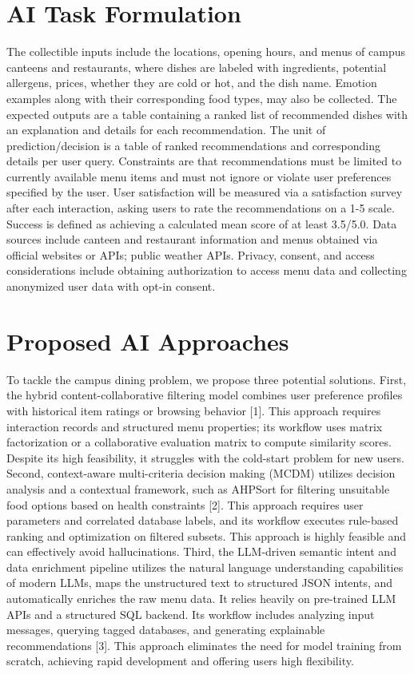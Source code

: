 \documentclass{article}
\begin{document}
\section{AI Task Formulation}
The collectible inputs include the locations, opening hours, and menus of campus canteens and restaurants, where dishes are labeled with ingredients, potential allergens, prices, whether they are cold or hot, and the dish name. Emotion examples along with their corresponding food types, may also be collected. The expected outputs are a table containing a ranked list of recommended dishes with an explanation and details for each recommendation. The unit of prediction/decision is a table of ranked recommendations and corresponding details per user query. Constraints are that recommendations must be limited to currently available menu items and must not ignore or violate user preferences specified by the user. User satisfaction will be measured via a satisfaction survey after each interaction, asking users to rate the recommendations on a 1-5 scale. Success is defined as achieving a calculated mean score of at least 3.5/5.0. Data sources include canteen and restaurant information and menus obtained via official websites or APIs; public weather APIs. Privacy, consent, and access considerations include obtaining authorization to access menu data and collecting anonymized user data with opt-in consent.

\section{Proposed AI Approaches}
To tackle the campus dining problem, we propose three potential solutions.
First, the hybrid content-collaborative filtering model combines user preference profiles with historical item ratings or browsing behavior [1]. This approach requires interaction records and structured menu properties; its workflow uses matrix factorization or a collaborative evaluation matrix to compute similarity scores. Despite its high feasibility, it struggles with the cold-start problem for new users.
Second, context-aware multi-criteria decision making (MCDM) utilizes decision analysis and a contextual framework, such as AHPSort for filtering unsuitable food options based on health constraints [2]. This approach requires user parameters and correlated database labels, and its workflow executes rule-based ranking and optimization on filtered subsets. This approach is highly feasible and can effectively avoid hallucinations.
Third, the LLM-driven semantic intent and data enrichment pipeline utilizes the natural language understanding capabilities of modern LLMs, maps the unstructured text to structured JSON intents, and automatically enriches the raw menu data. It relies heavily on pre-trained LLM APIs and a structured SQL backend. Its workflow includes analyzing input messages, querying tagged databases, and generating explainable recommendations [3]. This approach eliminates the need for model training from scratch, achieving rapid development and offering users high flexibility.
\end{document}
